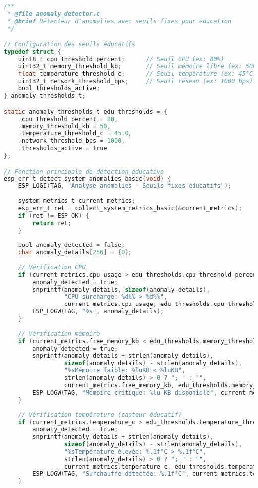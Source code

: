 \begin{lstlisting}[language=C, caption={Détecteur d'anomalies éducatif - anomaly\_detector.c}, label=lst:anomaly-detector]
/**
 * @file anomaly_detector.c  
 * @brief Détecteur d'anomalies avec seuils fixes pour éducation
 */

// Configuration des seuils éducatifs
typedef struct {
    uint8_t cpu_threshold_percent;      // Seuil CPU (ex: 80%)
    uint32_t memory_threshold_kb;       // Seuil mémoire libre (ex: 50KB)
    float temperature_threshold_c;      // Seuil température (ex: 45°C)
    uint32_t network_threshold_bps;     // Seuil réseau (ex: 1000 bps)
    bool thresholds_active;
} anomaly_thresholds_t;

static anomaly_thresholds_t edu_thresholds = {
    .cpu_threshold_percent = 80,
    .memory_threshold_kb = 50,
    .temperature_threshold_c = 45.0,
    .network_threshold_bps = 1000,
    .thresholds_active = true
};

// Fonction principale de détection éducative
esp_err_t detect_system_anomalies_basic(void) {
    ESP_LOGI(TAG, "Analyse anomalies - Seuils fixes éducatifs");
    
    system_metrics_t current_metrics;
    esp_err_t ret = collect_system_metrics_basic(&current_metrics);
    if (ret != ESP_OK) {
        return ret;
    }
    
    bool anomaly_detected = false;
    char anomaly_details[256] = {0};
    
    // Vérification CPU
    if (current_metrics.cpu_usage > edu_thresholds.cpu_threshold_percent) {
        anomaly_detected = true;
        snprintf(anomaly_details, sizeof(anomaly_details), 
                 "CPU surcharge: %d%% > %d%%", 
                 current_metrics.cpu_usage, edu_thresholds.cpu_threshold_percent);
        ESP_LOGW(TAG, "%s", anomaly_details);
    }
    
    // Vérification mémoire
    if (current_metrics.free_memory_kb < edu_thresholds.memory_threshold_kb) {
        anomaly_detected = true;
        snprintf(anomaly_details + strlen(anomaly_details), 
                 sizeof(anomaly_details) - strlen(anomaly_details),
                 "%sMémoire faible: %luKB < %luKB", 
                 strlen(anomaly_details) > 0 ? "; " : "",
                 current_metrics.free_memory_kb, edu_thresholds.memory_threshold_kb);
        ESP_LOGW(TAG, "Mémoire critique: %lu KB disponible", current_metrics.free_memory_kb);
    }
    
    // Vérification température (capteur éducatif)
    if (current_metrics.temperature_c > edu_thresholds.temperature_threshold_c) {
        anomaly_detected = true;
        snprintf(anomaly_details + strlen(anomaly_details),
                 sizeof(anomaly_details) - strlen(anomaly_details),
                 "%sTempérature élevée: %.1f°C > %.1f°C",
                 strlen(anomaly_details) > 0 ? "; " : "",
                 current_metrics.temperature_c, edu_thresholds.temperature_threshold_c);
        ESP_LOGW(TAG, "Surchauffe détectée: %.1f°C", current_metrics.temperature_c);
    }
    

\end{lstlisting}
